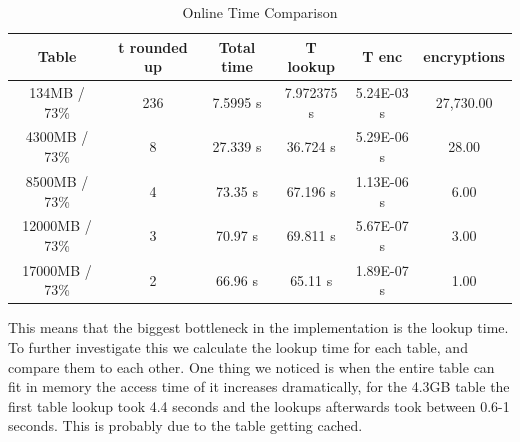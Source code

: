 \begin{table}[H]
\centering
\caption{Online Time Comparison}
\label{tab:OnlineT}
\begin{tabular}{|c|ccccc}
\hline
Table          & \multicolumn{1}{c|}{t rounded up} & \multicolumn{1}{c|}{Total time} & \multicolumn{1}{c|}{T lookup} & \multicolumn{1}{c|}{T enc} & \multicolumn{1}{c|}{encryptions} \\ \hline
134MB / 73\%   & 236                           & 7.5995 s                        & 7.972375 s                    & 5.24E-03 s                 & 27,730.00                        \\ \cline{1-1}
4300MB / 73\%  & 8                             & 27.339 s                        & 36.724 s                      & 5.29E-06 s                 & 28.00                            \\ \cline{1-1}
8500MB / 73\%  & 4                             & 73.35 s                         & 67.196 s                      & 1.13E-06 s                 & 6.00                             \\ \cline{1-1}
12000MB / 73\% & 3                             & 70.97 s                         & 69.811 s                      & 5.67E-07 s                 & 3.00                             \\ \cline{1-1}
17000MB / 73\%  & 2                             & 66.96 s                         & 65.11 s                       & 1.89E-07 s                 & 1.00                             \\ \cline{1-1}
\end{tabular}
\end{table}
This means that the biggest bottleneck in the implementation is the lookup time. To further investigate this we calculate the lookup time for each table, and compare them to each other. One thing we noticed is when the entire table can fit in memory the access time of it increases dramatically, for the 4.3GB table the first table lookup took 4.4 seconds and the lookups afterwards took between 0.6-1 seconds. This is probably due to the table getting cached.
